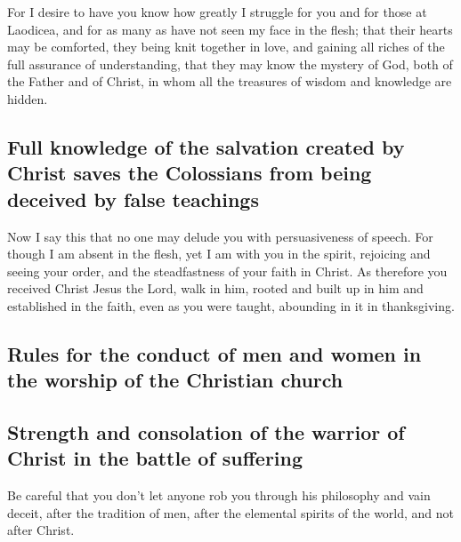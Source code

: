  For I desire to have you know how greatly I struggle for
you and for those at Laodicea, and for as many as have not seen my face
in the flesh;  that their hearts may be comforted, they
being knit together in love, and gaining all riches of the full
assurance of understanding, that they may know the mystery of God, both
of the Father and of Christ,  in whom all the treasures of
wisdom and knowledge are hidden.

\hypertarget{full-knowledge-of-the-salvation-created-by-christ-saves-the-colossians-from-being-deceived-by-false-teachings}{%
\subsection{Full knowledge of the salvation created by Christ saves the
Colossians from being deceived by false
teachings}\label{full-knowledge-of-the-salvation-created-by-christ-saves-the-colossians-from-being-deceived-by-false-teachings}}

 Now I say this that no one may delude you with
persuasiveness of speech.  For though I am absent in the
flesh, yet I am with you in the spirit, rejoicing and seeing your order,
and the steadfastness of your faith in Christ.  As
therefore you received Christ Jesus the Lord, walk in him,
 rooted and built up in him and established in the faith,
even as you were taught, abounding in it in thanksgiving.

\hypertarget{rules-for-the-conduct-of-men-and-women-in-the-worship-of-the-christian-church}{%
\subsection{Rules for the conduct of men and women in the worship of the
Christian
church}\label{rules-for-the-conduct-of-men-and-women-in-the-worship-of-the-christian-church}}

\hypertarget{strength-and-consolation-of-the-warrior-of-christ-in-the-battle-of-suffering}{%
\subsection{Strength and consolation of the warrior of Christ in the
battle of
suffering}\label{strength-and-consolation-of-the-warrior-of-christ-in-the-battle-of-suffering}}

 Be careful that you don't let anyone rob you through his
philosophy and vain deceit, after the tradition of men, after the
elemental spirits of the world, and not after Christ.

